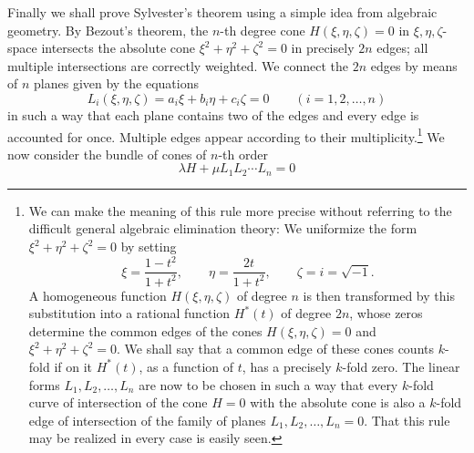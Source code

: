 Finally we shall prove Sylvester's theorem using a simple idea from algebraic geometry. By Bezout's theorem, the $n$-th degree cone $H(\xi,\eta,\zeta)=0$ in $\xi,\eta,\zeta$-space intersects the absolute cone $\xi^2+\eta^2+\zeta^2=0$ in precisely $2n$ edges; all multiple intersections are correctly weighted. We connect the $2n$ edges by means of $n$ planes given by the equations
\[
L_i(\xi,\eta,\zeta)=a_i\xi+b_i\eta+c_i\zeta=0\qquad(i=1,2,\ldots,n)
\]
in such a way that each plane contains two of the edges and every edge is accounted for once. Multiple edges appear according to their multiplicity.\footnote{We can make the meaning of this rule more precise without referring to the difficult general algebraic elimination theory: We uniformize the form $\xi^2+\eta^2+\zeta^2=0$ by setting
\[
\xi=\frac{1-t^2}{1+t^2},\qquad \eta=\frac{2t}{1+t^2},\qquad \zeta=i=\sqrt{-1}.
\]
A homogeneous function $H(\xi,\eta,\zeta)$ of degree $n$ is then transformed by this substitution into a rational function $H^*(t)$ of degree $2n$, whose zeros determine the common edges of the cones $H(\xi,\eta,\zeta)=0$ and $\xi^2+\eta^2+\zeta^2=0$. We shall say that a common edge of these cones counts $k$-fold if on it $H^*(t)$, as a function of $t$, has a precisely $k$-fold zero. The linear forms $L_1,L_2,\ldots,L_n$ are now to be chosen in such a way that every $k$-fold curve of intersection of the cone $H=0$ with the absolute cone is also a $k$-fold edge of intersection of the family of planes $L_1,L_2,\ldots,L_n=0$. That this rule may be realized in every case is easily seen.} We now consider the bundle of cones of $n$-th order
\[
\lambda H+\mu L_1L_2\cdots L_n=0
\]

